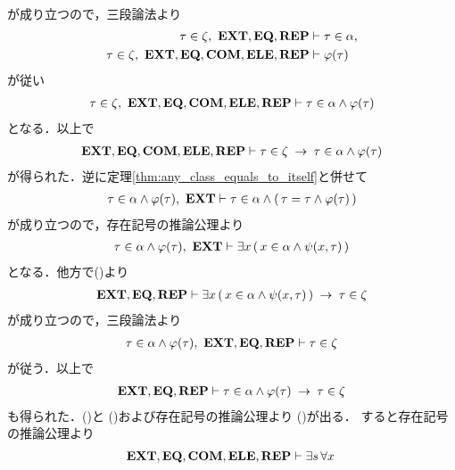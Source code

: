 \begin{sketch}
\begin{description}
\begin{align}
				\end{align}
				が成り立つので，三段論法より
				\begin{align}
					\tau \in \zeta,\ \mbox{{\bf EXT}},\mbox{{\bf EQ}},\mbox{{\bf REP}} &\vdash \tau \in \alpha, \\
					\tau \in \zeta,\ \mbox{{\bf EXT}},\mbox{{\bf EQ}},\mbox{\bf COM},\mbox{{\bf ELE}},\mbox{{\bf REP}} &\vdash \varphi(\tau)
				\end{align}
				が従い
				\begin{align}
					\tau \in \zeta,\ \mbox{{\bf EXT}},\mbox{{\bf EQ}},\mbox{\bf COM},\mbox{{\bf ELE}},\mbox{{\bf REP}} \vdash
					\tau \in \alpha \wedge \varphi(\tau)
				\end{align}
				となる．以上で
				\begin{align}
					\mbox{{\bf EXT}},\mbox{{\bf EQ}},\mbox{\bf COM},\mbox{{\bf ELE}},\mbox{{\bf REP}} \vdash \tau \in \zeta \hspace{0.25em}\rightarrow\hspace{0.25em}
					\tau \in \alpha \wedge \varphi(\tau)
					\label{fom:thm_axiom_of_separation_6}
				\end{align}
				が得られた．逆に定理\ref{thm:any_class_equals_to_itself}と併せて
				\begin{align}
					\tau \in \alpha \wedge \varphi(\tau),\ \mbox{{\bf EXT}} \vdash
					\tau \in \alpha \wedge (\, \tau = \tau \wedge \varphi(\tau)\, )
				\end{align}
				が成り立つので，存在記号の推論公理より
				\begin{align}
					\tau \in \alpha \wedge \varphi(\tau),\ \mbox{{\bf EXT}} \vdash
					\exists x\, (\, x \in \alpha \wedge \psi(x,\tau)\, )
				\end{align}
				となる．他方で()より
				\begin{align}
					\mbox{{\bf EXT}},\mbox{{\bf EQ}},\mbox{{\bf REP}} \vdash 
					\exists x\, (\, x \in \alpha \wedge 
					\psi(x,\tau)\, ) \hspace{0.25em}\rightarrow\hspace{0.25em} \tau \in \zeta
				\end{align}
				が成り立つので，三段論法より
				\begin{align}
					\tau \in \alpha \wedge \varphi(\tau),\ 
					\EXTAX,\EQAX,\REPAX \vdash \tau \in \zeta
				\end{align}
				が従う．以上で
				\begin{align}
					\mbox{{\bf EXT}},\mbox{{\bf EQ}},\mbox{{\bf REP}} \vdash 
					\tau \in \alpha \wedge \varphi(\tau) \hspace{0.25em}\rightarrow\hspace{0.25em} \tau \in \zeta
					\label{fom:thm_axiom_of_separation_7}
				\end{align}
				も得られた．()と
				()および存在記号の推論公理より
				()が出る．
				すると存在記号の推論公理より
				\begin{align}
					\EXTAX,\EQAX,\COMAX,\ELEAX,\REPAX \vdash \exists s\, \forall x\,

\end{align}
\end{description}
\end{sketch}
